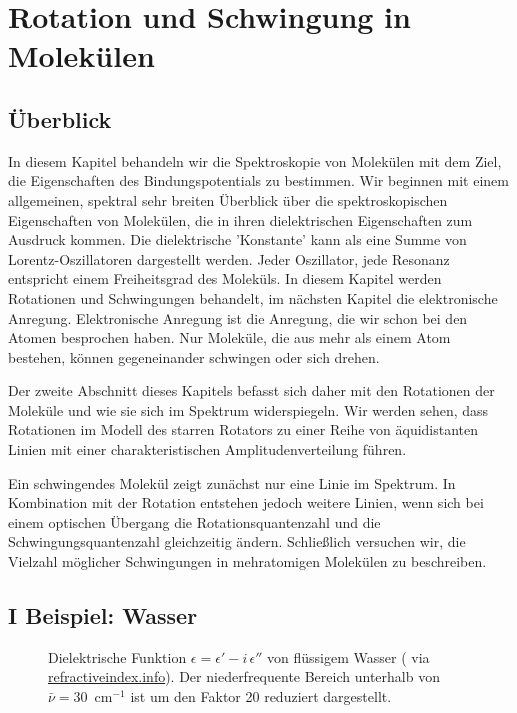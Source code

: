 \renewcommand{\lastmod}{16. Dezember 2024}
\renewcommand{\chapterauthors}{Markus Lippitz}

\chapter{Rotation und Schwingung in Molekülen}



\section{Überblick}


In diesem Kapitel behandeln wir die Spektroskopie von Molekülen mit dem Ziel, die Eigenschaften des Bindungspotentials zu bestimmen. Wir beginnen mit einem allgemeinen, spektral sehr breiten Überblick über die spektroskopischen Eigenschaften von Molekülen, die in ihren dielektrischen Eigenschaften zum Ausdruck kommen. Die dielektrische 'Konstante' kann als eine Summe von Lorentz-Oszillatoren dargestellt werden.  Jeder Oszillator, jede Resonanz entspricht einem Freiheitsgrad des Moleküls. In diesem Kapitel werden Rotationen und Schwingungen behandelt, im nächsten Kapitel die elektronische Anregung. Elektronische Anregung ist die Anregung, die wir schon bei den Atomen besprochen haben. Nur Moleküle, die aus mehr als einem Atom bestehen, können gegeneinander schwingen oder sich drehen.

Der zweite Abschnitt dieses Kapitels befasst sich daher mit den Rotationen der Moleküle und wie sie sich im Spektrum widerspiegeln. Wir werden sehen, dass Rotationen im Modell des starren Rotators zu einer Reihe von äquidistanten Linien mit einer charakteristischen Amplitudenverteilung führen.

Ein schwingendes Molekül zeigt zunächst nur eine Linie im Spektrum. In Kombination mit der Rotation entstehen jedoch weitere Linien, wenn sich bei einem optischen Übergang die Rotationsquantenzahl und die Schwingungsquantenzahl gleichzeitig ändern. Schließlich versuchen wir, die Vielzahl möglicher Schwingungen in mehratomigen Molekülen zu beschreiben.


\section{I Beispiel: Wasser}

\begin{figure}
\caption{Dielektrische Funktion $\epsilon = \epsilon' - i \, \epsilon''$ von flüssigem Wasser (\cite{Segelstein_water} via 
\href{https://refractiveindex.info/?shelf=main&book=H2O&page=Segelstein}{refractiveindex.info}). Der niederfrequente Bereich unterhalb von $\bar{\nu} = 30$~cm$^{-1}$ ist um den Faktor 20 reduziert dargestellt.
\label{fig:diel_water}}

\end{figure}


